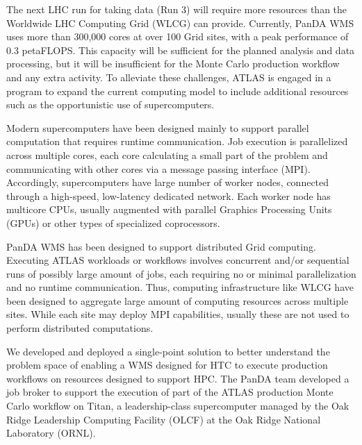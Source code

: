 The next LHC run for taking data (Run 3) will require more resources than the
Worldwide LHC Computing Grid (WLCG) can provide. Currently, PanDA WMS uses more
than
300,000 cores at over 100 Grid sites, with a peak performance of 0.3 petaFLOPS. This
capacity will be sufficient for the planned analysis and data processing, but it
will be insufficient for the Monte Carlo production workflow and any extra
activity. To alleviate these challenges, ATLAS is engaged in a program to expand
the current computing model to include additional resources such as the
opportunistic use of supercomputers.


Modern supercomputers have been designed mainly to support parallel computation
that requires runtime communication. Job execution is parallelized across
multiple cores, each core calculating a small part of the problem and
communicating with other cores via a message passing interface (MPI).
Accordingly, supercomputers have large number of worker nodes, connected through
a high-speed, low-latency dedicated network. Each worker node has multicore
CPUs, usually augmented with parallel Graphics Processing Units (GPUs) or other
types of specialized coprocessors.


PanDA WMS has been designed to support distributed Grid computing. Executing
ATLAS workloads or workflows involves concurrent and/or sequential runs of
possibly large amount of jobs, each requiring no or minimal parallelization and
no runtime communication. Thus, computing infrastructure like WLCG have been
designed to aggregate large amount of computing resources across multiple sites.
While each site may deploy MPI capabilities, usually these are not used to
perform distributed computations.

We developed and deployed a single-point solution to better understand the
problem space of enabling a WMS designed for HTC to execute production workflows
on resources designed to support HPC. The PanDA team developed a job broker to
support the execution of part of the ATLAS production Monte Carlo workflow on
Titan, a leadership-class supercomputer managed by the Oak Ridge Leadership
Computing Facility (OLCF) at the Oak Ridge National Laboratory (ORNL).

